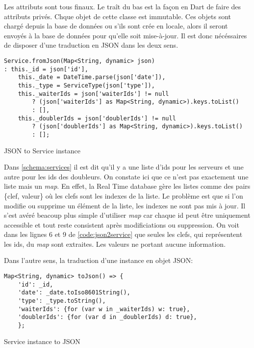 Les attributs sont tous finaux. Le traît du bas est la façon en Dart de faire des attributs privés. Chque objet de cette classe est immutable. Ces objets sont chargé depuis la base de données ou s'ils sont crée en locale, alors il seront envoyés à la base de données pour qu'elle soit mise-à-jour. Il est donc nécéssaires de disposer d'une traduction en JSON dans les deux sens. 

\begin{listing}[!h]
\begin{verbatim}
Service.fromJson(Map<String, dynamic> json)
: this._id = json['id'],
    this._date = DateTime.parse(json['date']),
    this._type = ServiceType(json['type']),
    this._waiterIds = json['waiterIds'] != null
        ? (json['waiterIds'] as Map<String, dynamic>).keys.toList()
        : [],
    this._doublerIds = json['doublerIds'] != null
        ? (json['doublerIds'] as Map<String, dynamic>).keys.toList()
        : [];
\end{verbatim}
\caption{JSON to Service instance}
\label{code:json2service}
\end{listing}

Dans \ref{schema:services} il est dit qu'il y a une liste d'ids pour les serveurs et une autre pour les ids des doubleurs. On constate ici que ce n'est pas exactement une liste mais un \textit{map}. En effet, la Real Time database gère les listes comme des pairs \{clef, valeur\} où les clefs sont les indexes de la liste. Le problème est que si l'on modifie ou supprime un élément de la liste, les indexes ne sont pas mis à jour. Il s'est avéré beacoup plus simple d'utiliser \textit{map} car chaque id peut être uniquement accessible et tout reste consistent après modificiations ou suppression. On voit dans les lignes 6 et 9 de \ref{code:json2service} que seules les clefs, qui représentent les ids, du \textit{map} sont extraites. Les valeurs ne portant aucune information. 

Dans l'autre sens, la traduction d'une instance en objet JSON:

\begin{listing}[!h]
\begin{verbatim}
Map<String, dynamic> toJson() => {
    'id': _id,
    'date': _date.toIso8601String(),
    'type': _type.toString(),
    'waiterIds': {for (var w in _waiterIds) w: true},
    'doublerIds': {for (var d in _doublerIds) d: true},
    };
\end{verbatim}
\caption{Service instance to JSON}
\label{code:service2json}
\end{listing}

